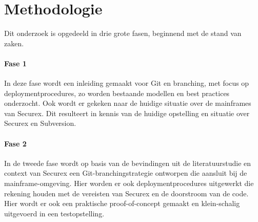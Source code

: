 
\section{Methodologie}%
\label{sec:methodologie}


Dit onderzoek is opgedeeld in drie grote fasen, beginnend met de stand van zaken.

\paragraph{Fase 1}
In deze fase wordt een inleiding gemaakt voor Git en branching, met focus op deploymentprocedures, zo worden bestaande modellen en best practices onderzocht. Ook wordt er gekeken naar de huidige situatie over de mainframes van Securex. Dit resulteert in kennis van de huidige opstelling en situatie over Securex en Subversion.

\paragraph{Fase 2}
In de tweede fase wordt op basis van de bevindingen uit de literatuurstudie en context van Securex een Git-branchingstrategie ontworpen die aansluit bij de mainframe-omgeving. Hier worden er ook deploymentprocedures uitgewerkt die rekening houden met de vereisten van Securex en de doorstroom van de code. Hier wordt er ook een praktische proof-of-concept gemaakt en klein-schalig uitgevoerd in een testopstelling. 

